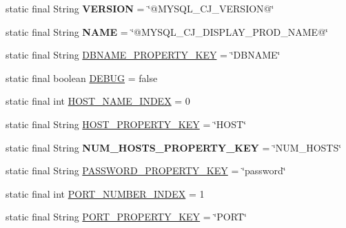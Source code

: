 \begin{DoxyCompactItemize}
static final String {\bfseries V\+E\+R\+S\+I\+ON} = \char`\"{}@M\+Y\+S\+Q\+L\+\_\+\+C\+J\+\_\+\+V\+E\+R\+S\+I\+ON@\char`\"{}
\item 
\mbox{\label{classcom_1_1mysql_1_1jdbc_1_1_non_registering_driver_a3fb50dd9388c8f9c5491b9f47b33f15a}} 
static final String {\bfseries N\+A\+ME} = \char`\"{}@M\+Y\+S\+Q\+L\+\_\+\+C\+J\+\_\+\+D\+I\+S\+P\+L\+A\+Y\+\_\+\+P\+R\+O\+D\+\_\+\+N\+A\+ME@\char`\"{}
\item 
static final String \mbox{\hyperlink{classcom_1_1mysql_1_1jdbc_1_1_non_registering_driver_a6dc58ccad9de28af750537c528a3a62b}{D\+B\+N\+A\+M\+E\+\_\+\+P\+R\+O\+P\+E\+R\+T\+Y\+\_\+\+K\+EY}} = \char`\"{}D\+B\+N\+A\+ME\char`\"{}
\item 
static final boolean \mbox{\hyperlink{classcom_1_1mysql_1_1jdbc_1_1_non_registering_driver_ae7307c66ef2906ae1308c04e44e3caac}{D\+E\+B\+UG}} = false
\item 
static final int \mbox{\hyperlink{classcom_1_1mysql_1_1jdbc_1_1_non_registering_driver_a479a882e31683d1b46ddea0cc8455837}{H\+O\+S\+T\+\_\+\+N\+A\+M\+E\+\_\+\+I\+N\+D\+EX}} = 0
\item 
static final String \mbox{\hyperlink{classcom_1_1mysql_1_1jdbc_1_1_non_registering_driver_ad1bd589421967c4b4ab12f16ca9421ec}{H\+O\+S\+T\+\_\+\+P\+R\+O\+P\+E\+R\+T\+Y\+\_\+\+K\+EY}} = \char`\"{}H\+O\+ST\char`\"{}
\item 
\mbox{\label{classcom_1_1mysql_1_1jdbc_1_1_non_registering_driver_a2305d52ddb3ff964cc1ba7cd2e1cf62c}} 
static final String {\bfseries N\+U\+M\+\_\+\+H\+O\+S\+T\+S\+\_\+\+P\+R\+O\+P\+E\+R\+T\+Y\+\_\+\+K\+EY} = \char`\"{}N\+U\+M\+\_\+\+H\+O\+S\+TS\char`\"{}
\item 
static final String \mbox{\hyperlink{classcom_1_1mysql_1_1jdbc_1_1_non_registering_driver_a2cc8ed1d0611f68f2c833d817f700229}{P\+A\+S\+S\+W\+O\+R\+D\+\_\+\+P\+R\+O\+P\+E\+R\+T\+Y\+\_\+\+K\+EY}} = \char`\"{}password\char`\"{}
\item 
static final int \mbox{\hyperlink{classcom_1_1mysql_1_1jdbc_1_1_non_registering_driver_a656da0019ee7dd954869fea6509140a3}{P\+O\+R\+T\+\_\+\+N\+U\+M\+B\+E\+R\+\_\+\+I\+N\+D\+EX}} = 1
\item 
static final String \mbox{\hyperlink{classcom_1_1mysql_1_1jdbc_1_1_non_registering_driver_ac4a98996247b19c31888e0c5435670c5}{P\+O\+R\+T\+\_\+\+P\+R\+O\+P\+E\+R\+T\+Y\+\_\+\+K\+EY}} = \char`\"{}P\+O\+RT\char`\"{}

\end{DoxyCompactItemize}
